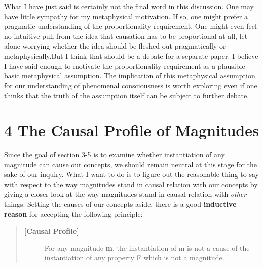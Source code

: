 \documentclass[a4paper,12pt]{article}
\begin{document}
What I have just said is certainly not the final word in this discussion. One may have little sympathy for my metaphysical motivation. If so, one might prefer a pragmatic understanding of the proportionality requirement. One might even feel no intuitive pull from the idea that causation has to be proportional at all, let alone worrying whether the idea should be fleshed out pragmatically or metaphysically.\footnotemark But I think that should be a debate for a separate paper. I believe I have said enough to motivate the proportionality requirement as a plausible basic metaphysical assumption. The implication of this metaphysical assumption for our understanding of phenomenal consciousness is worth exploring even if one thinks that the truth of the assumption itself can be subject to further debate.


\section*{4 The Causal Profile of Magnitudes}

Since the goal of section 3-5 is to examine whether instantiation of any magnitude can cause our concepts, we should remain neutral at this stage for the sake of our inquiry. What I want to do is to figure out the reasonable thing to say with respect to the way magnitudes stand in causal relation with our concepts by giving a closer look at the way magnitudes stand in causal relation with \emph{other} things. Setting the causes of our concepts aside, there is a good \textbf{inductive reason} for accepting the following principle:

\begin{quote}
\begin{description}
\item[\textbf{[Causal Profile]}] For any magnitude \textbf{m}, the instantiation of m is not a cause of the instantiation of any property F which is not a magnitude.
\end{description}
\end{quote}
\end{document}
